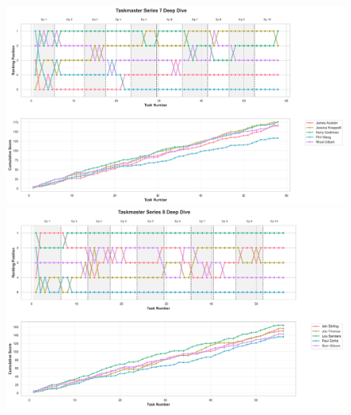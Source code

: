 \documentclass[10pt,letterpaper]{article}
\begin{document}
\begin{figure}[!h]
\centering
\includegraphics[width=\linewidth]{figures/supplementary/series_7_deep_dive.png}
\includegraphics[width=\linewidth]{figures/supplementary/series_8_deep_dive.png}
\end{figure}
\FloatBarrier
\clearpage
\end{document}
